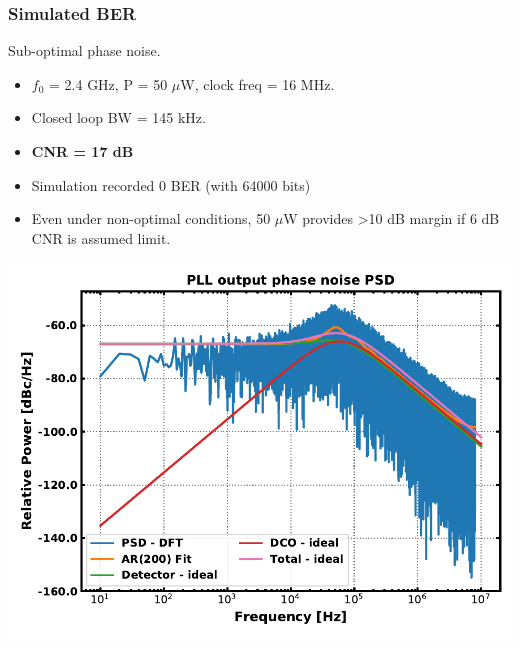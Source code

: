 \documentclass[t, screen, aspectratio=43]{beamer}
\begin{document}
\begin{frame}
	\frametitle{Simulated BER}
	\begin{block}{Sub-optimal phase noise.}
	\begin{minipage}{5cm}
		\begin{itemize}
			\scriptsize
			\item $f_0$ = 2.4 GHz, P = 50 $\mu$W, clock freq = 16 MHz.
			\item Closed loop BW = 145 kHz.
			\item \textbf{CNR = 17 dB}
			\item Simulation recorded 0 BER (with 64000 bits)
			\item Even under non-optimal conditions, 50 $\mu$W provides >10 dB margin if 6 dB CNR is assumed limit.
		\end{itemize} 	
	\end{minipage}
	\begin{minipage}{6cm}
		\vspace{1em}
		\hspace{1em}\includegraphics[width=1\textwidth, angle=0]{trans_phase_noise.pdf}
	\end{minipage}
	\end{block}
\end{frame}


\end{document}
